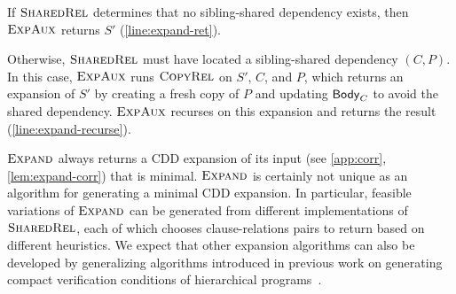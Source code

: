 If $\textsc{SharedRel}$ determines that no sibling-shared dependency
exists, then $\textsc{ExpAux}$ returns $S'$
(\autoref{line:expand-ret}).

Otherwise, $\textsc{SharedRel}$ must have located a sibling-shared
dependency $(C, P)$. In this case, $\textsc{ExpAux}$ runs $\textsc{CopyRel} $ on
$S'$, $C$, and $P$, which returns an expansion of $S'$ by creating a
fresh copy of $P$ and updating $\mathsf{Body}_{C}$ to avoid the shared
dependency.
%
$\textsc{ExpAux}$ recurses on this expansion and returns the result
(\autoref{line:expand-recurse}).
%

$\textsc{Expand}$ always returns a CDD expansion of its input
(see \autoref{app:corr}, \autoref{lem:expand-corr}) that is minimal.
$\textsc{Expand}$ is certainly not unique as an algorithm for
generating a minimal CDD expansion.
%
In particular, feasible variations of $\textsc{Expand}$ can be
generated from different implementations of $\textsc{SharedRel}$, each of
which chooses clause-relations pairs to return based on different
heuristics.
%
We expect that other expansion algorithms can also be developed by
generalizing algorithms introduced in previous work on generating
compact verification conditions of hierarchical
programs~\cite{lal-qadeer15}.

